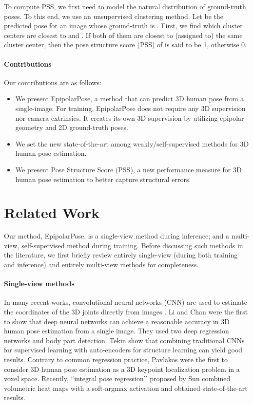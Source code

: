 \documentclass[10pt,twocolumn,letterpaper]{article}
\begin{document}
To compute PSS, we first need to model the natural distribution of ground-truth poses. To this end, we use an unsupervised clustering method. Let  be the predicted pose for an image whose ground-truth is . First, we find which cluster centers are closest to  and . If both of them are closest to (\ie assigned to) the same cluster center, then the pose structure score (PSS) of  is said to be 1, otherwise 0.
\paragraph{Contributions}
Our contributions are as follows: 
\begin{itemize}
\item We present EpipolarPose, a method that can predict 3D human pose from a single-image. For training,  EpipolarPose does not require any 3D supervision nor camera extrinsics. It creates its own 3D supervision by utilizing epipolar geometry and 2D ground-truth poses. 
\item We set the new state-of-the-art among weakly/self-supervised methods for 3D human pose estimation.
\item We present Pose Structure Score (PSS), a new performance measure  for 3D human pose estimation to better capture structural errors.  
\end{itemize}
\section{Related Work}
Our method, EpipolarPose, is a single-view method during inference; and a multi-view, self-supervised method during training. Before discussing such methods in the literature, we first briefly review entirely single-view (during both training and inference) and entirely multi-view methods for completeness. 
\paragraph{Single-view methods} 
In many recent works, convolutional neural networks (CNN) are used  to estimate the coordinates of the 3D joints directly from images \cite{structured3d,fuse_tekin,Tome_2017_CVPR,compositional2017,monocular3d}. Li and Chan \cite{monocular_asia} were the first to show that deep neural networks can achieve a reasonable accuracy in 3D human pose estimation from a single image. They used two deep regression networks and body part detection. Tekin \etal \cite{structured3d} show that combining traditional CNNs for supervised learning with auto-encoders for structure learning can yield good results. Contrary to common regression practice, Pavlakos \etal \cite{pavlakos17volumetric} were the first to consider 3D human pose estimation as a 3D keypoint localization problem in a voxel space. Recently, ``integral pose regression’’ proposed by Sun \etal \cite{Sun_2018_ECCV} combined volumetric heat maps with a soft-argmax activation and obtained state-of-the-art results.
\end{document}
